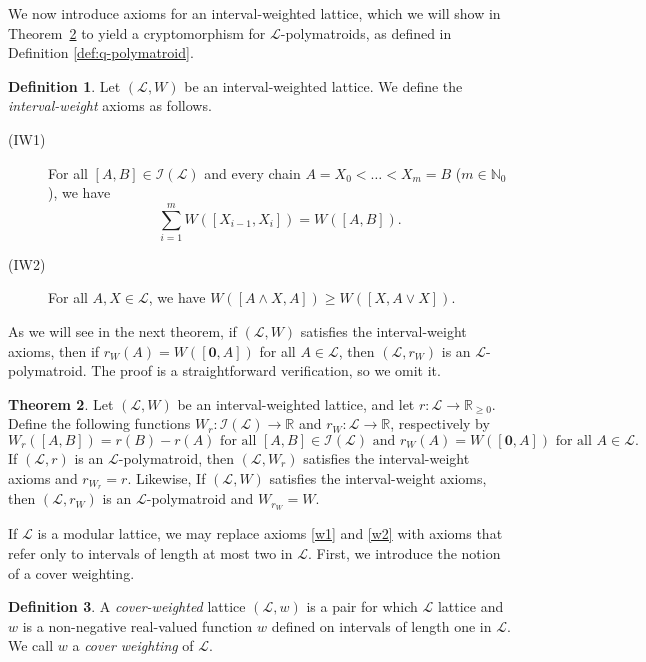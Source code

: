 \documentclass[a4paper,11pt,reqno]{article}
\makeatletter
\def\namedlabel#1#2{\begingroup
    #2%
    \def\@currentlabel{#2}%
    \phantomsection\label{#1}\endgroup
}
\theoremstyle{definition}
\newtheorem{theorem}{Theorem}[section]
\newtheorem{definition}[theorem]{{{Definition}}}
\newcommand{\mL}{\mathcal{L}}
\newcommand{\I}{\mathcal{I}}
\newcommand{\zero}{{\mathbf{0}}}
\makeatother
\begin{document}
We now introduce axioms for an interval-weighted lattice, which we will show in 
Theorem~\ref{thm:q-poly_lattice_crypt} to yield a cryptomorphism for $\mL$-polymatroids, as defined in Definition \ref{def:q-polymatroid}.

\begin{definition}
    Let $(\mathcal{L},W)$ be an interval-weighted lattice. We define the \emph{interval-weight} axioms as follows.
    \begin{description}
        \item[\namedlabel{w1}{\rm (IW1)}] For all $[A,B]\in\mathcal{I}(\mathcal{L})$ and every chain $A=X_0<\dots< X_m=B$ ($m\in\mathbb{N}_0$), we have 
        $$\sum_{i=1}^mW([X_{i-1},X_i])=W([A,B]).$$
        \item[\namedlabel{w2}{\rm (IW2)}] For all $A, X \in\mathcal{L}$, we have $W([A\wedge X,A])\geq W([X,A\vee X])$.
    \end{description}
\end{definition}

As we will see in the next theorem, if $(\mL,W)$ satisfies the interval-weight axioms, then if $r_W(A)=W([\zero,A])$ for all $A\in\mathcal{L}$, then $(\mathcal{L},r_W)$ is an $\mathcal{L}$-polymatroid. The proof is a straightforward verification, so we omit it.

\begin{theorem}\label{thm:q-poly_lattice_crypt}
Let $(\mL,W)$ be an interval-weighted lattice, and let 
$r:\mathcal{L}\rightarrow\mathbb{R}_{\geq 0}$.
Define the following functions $W_r:\mathcal{I}(\mL) \longrightarrow \mathbb {R}$ and $r_W:\mathcal{L} \longrightarrow \mathbb{R}$, respectively by
     \[
     W_r([A,B])=r(B)-r(A) \text{ for all }[A,B] \in \I(\mL) \text{ and } 
     r_W(A)=W([\zero,A]) \text{ for all } A \in \mL.
     \]
If $(\mathcal{L}, r)$ is an $\mathcal{L}$-polymatroid, then $(\mathcal{L}, W_r)$ satisfies
the interval-weight axioms and $r_{W_r} = r$. Likewise, If $(\mathcal{L}, W )$ satisfies the interval-weight
axioms, then $(\mathcal{L}, r_W )$ is an $\mathcal{L}$-polymatroid and $W_{r_W} = W$.
\end{theorem}

If $\mL$ is a modular lattice, we may replace axioms \ref{w1} and \ref{w2} with axioms that refer only to intervals of length at most two in $\mL$. First, we introduce the notion of a cover weighting.

\begin{definition}
    A \emph{cover-weighted} lattice $(\mathcal{L},w)$ is a pair for which $\mathcal{L}$ lattice and $w$ is a non-negative real-valued function $w$ defined on intervals of length one in $\mathcal{L}$. We call $w$ a \emph{cover weighting} of $\mathcal{L}$.
\end{definition}
\end{document}
